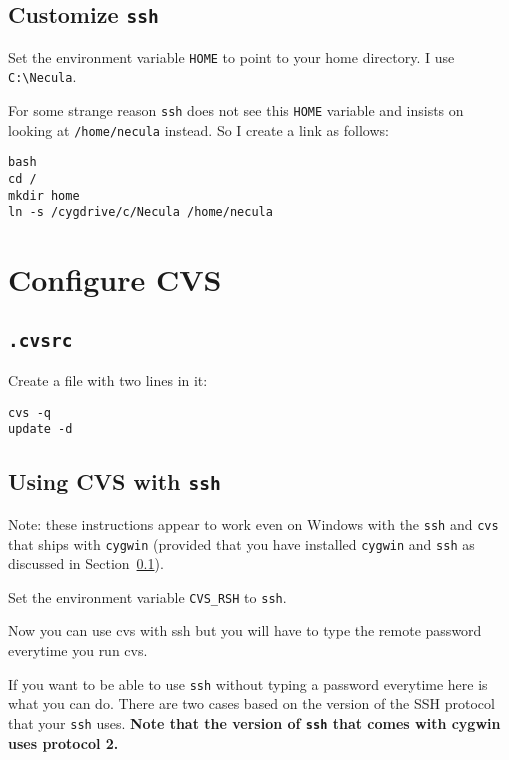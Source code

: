 \documentclass{article}
\def\t#1{{\tt #1}}
\begin{document}
 \subsection{Customize \t{ssh}}\label{sec-win-ssh}

 Set the environment variable \t{HOME} to point to your home directory. I use
 \t{C:\backslash Necula}. 

 For some strange reason \t{ssh} does not see this \t{HOME} variable and
insists on looking at \t{/home/necula} instead. So I create a link as follows:
\begin{verbatim}
bash
cd /
mkdir home
ln -s /cygdrive/c/Necula /home/necula
\end{verbatim}

\section{Configure CVS}

 \subsection{\t{.cvsrc}}

 Create a  file with two lines in it: 
\begin{verbatim}
cvs -q
update -d
\end{verbatim}

 \subsection{Using CVS with \t{ssh}}

 Note: these instructions appear to work even on Windows with the \t{ssh} and
\t{cvs} that ships with \t{cygwin} (provided that you have installed
\t{cygwin} and \t{ssh} as discussed in Section~\ref{sec-win-ssh}).

 Set the environment variable \t{CVS\_RSH} to \t{ssh}. 

 Now you can use cvs with ssh but you will have to type the remote password
 everytime you run cvs. 

 If you want to be able to use \t{ssh} without typing a password everytime
here is what you can do. There are two cases based on the version of the SSH
protocol that your \t{ssh} uses. {\bf Note that the version of \t{ssh} that
comes with cygwin uses protocol 2.}
\end{document}
